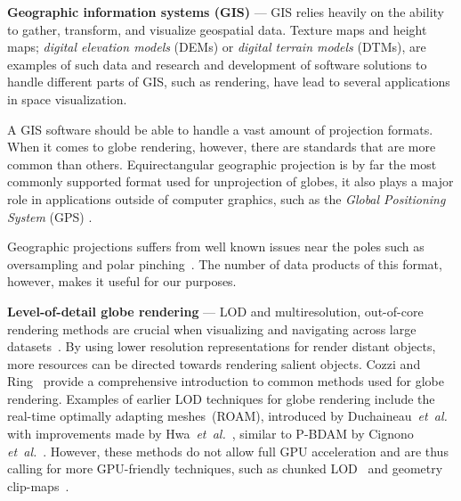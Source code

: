 \documentclass[journal]{vgtc}                %
\newcommand{\plgrem}[1]{\textcolor{blue}{~\textbf{!!}~}}
\newcommand{\etal}{\emph{et~al.}}
\begin{document}


\noindent\textbf{Geographic information systems (GIS)} --- GIS relies heavily on the ability to gather, transform, and visualize geospatial data.
Texture maps and height maps; \emph{digital elevation models} (DEMs) or \emph{digital terrain models} (DTMs), are examples of such data and research and development of software solutions to handle different parts of GIS, such as rendering, have lead to several applications in space visualization.

A GIS software should be able to handle a vast amount of projection formats. When it comes to globe rendering, however, there are standards that are more common than others.
Equirectangular geographic projection is by far the most commonly supported format used for unprojection of globes, it also plays a major role in applications outside of computer graphics, such as the \emph{Global Positioning System} (GPS) \cite{cozzi20113d}.

Geographic projections suffers from well known issues near the poles such as oversampling and polar pinching~\cite{cozzi20113d}. The number of data products of this format, however, makes it useful for our purposes.


\noindent\textbf{Level-of-detail globe rendering} ---
LOD and multiresolution, out-of-core rendering methods are crucial when visualizing and navigating across large datasets~\cite{luebke2003level}.
By using lower resolution representations for render distant objects, more resources can be directed towards rendering salient objects.
Cozzi and Ring~\cite{cozzi20113d} provide a comprehensive introduction to common methods used for globe rendering.
Examples of earlier LOD techniques for globe rendering include the real-time optimally adapting meshes~(ROAM), introduced by Duchaineau~\etal~\cite{duchaineau1997roaming} with improvements made by Hwa~\etal~\cite{hwa2005real}, similar to P-BDAM by Cignono \etal~\cite{cignoni2003planet,cignoni2003bdam}. However, these methods do not allow full GPU acceleration and are thus calling for more GPU-friendly techniques, such as chunked LOD~\cite{ulrich2002rendering} and geometry clip-maps~\cite{losasso2004geometry}.
\end{document}
